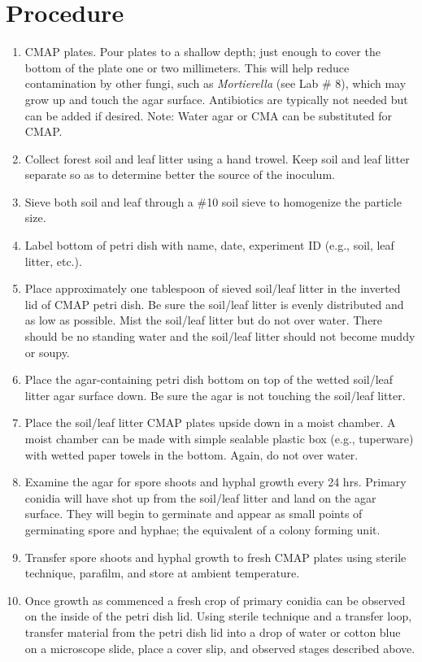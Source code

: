 \documentclass[]{book}
\begin{document}
\hypertarget{procedure}{%
\section{Procedure}\label{procedure}}

\begin{enumerate}
\def\labelenumi{\arabic{enumi}.}
\item
  CMAP plates. Pour plates to a shallow depth; just enough to cover the bottom of the plate one or two millimeters. This will help reduce contamination by other fungi, such as \emph{Mortierella} (see Lab \# 8), which may grow up and touch the agar surface. Antibiotics are typically not needed but can be added if desired. Note: Water agar or CMA can be substituted for CMAP.
\item
  Collect forest soil and leaf litter using a hand trowel. Keep soil and leaf litter separate so as to determine better the source of the inoculum.
\item
  Sieve both soil and leaf through a \#10 soil sieve to homogenize the particle size.
\item
  Label bottom of petri dish with name, date, experiment ID (e.g., soil, leaf litter, etc.).
\item
  Place approximately one tablespoon of sieved soil/leaf litter in the inverted lid of CMAP petri dish. Be sure the soil/leaf litter is evenly distributed and as low as possible. Mist the soil/leaf litter but do not over water. There should be no standing water and the soil/leaf litter should not become muddy or soupy.
\item
  Place the agar-containing petri dish bottom on top of the wetted soil/leaf litter agar surface down. Be sure the agar is not touching the soil/leaf litter.
\item
  Place the soil/leaf litter CMAP plates upside down in a moist chamber. A moist chamber can be made with simple sealable plastic box (e.g., tuperware) with wetted paper towels in the bottom. Again, do not over water.
\item
  Examine the agar for spore shoots and hyphal growth every 24 hrs. Primary conidia will have shot up from the soil/leaf litter and land on the agar surface. They will begin to germinate and appear as small points of germinating spore and hyphae; the equivalent of a colony forming unit.
\item
  Transfer spore shoots and hyphal growth to fresh CMAP plates using sterile technique, parafilm, and store at ambient temperature.
\item
  Once growth as commenced a fresh crop of primary conidia can be observed on the inside of the petri dish lid. Using sterile technique and a transfer loop, transfer material from the petri dish lid into a drop of water or cotton blue on a microscope slide, place a cover slip, and observed stages described above.
\end{enumerate}
\end{document}
